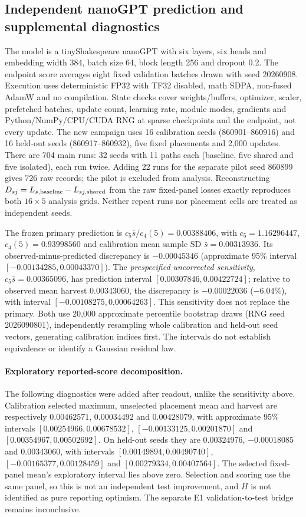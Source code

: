 \subsection{Independent nanoGPT prediction and supplemental diagnostics}
\label{sec:nanogpt-supplement}
The model is a tinyShakespeare nanoGPT with six layers, six heads and
embedding width 384, batch size 64, block length 256 and dropout 0.2.
The endpoint score averages eight fixed validation batches drawn with seed
20260908. Execution uses deterministic FP32 with TF32 disabled, math SDPA,
non-fused AdamW and no compilation. State checks cover weights/buffers,
optimizer, scaler, prefetched batches, update count, learning rate, module
modes, gradients and Python/NumPy/CPU/CUDA RNG at sparse checkpoints and the
endpoint, not every update.
The new campaign uses 16 calibration seeds (860901--860916) and 16
held-out seeds (860917--860932), five fixed placements and 2,000 updates.
There are 704 main runs: 32 seeds with 11 paths each (baseline, five shared
and five isolated), each run twice. Adding 22 runs for the separate pilot
seed 860899 gives 726 raw records; the pilot is excluded from analysis. Reconstructing
$D_{sj}=L_{s,\rm baseline}-L_{sj,\rm shared}$ from the raw fixed-panel
losses exactly reproduces both $16\times5$ analysis grids. Neither repeat
runs nor placement cells are treated as independent seeds.

The frozen primary prediction is $c_5\bar s/c_4(5)=0.00388406$, with
$c_5=1.16296447$, $c_4(5)=0.93998560$ and calibration mean sample SD
$\bar s=0.00313936$. Its observed-minus-predicted discrepancy is
$-0.00045346$ (approximate 95\% interval
$[-0.00134285,0.00043370]$). The \emph{prespecified uncorrected
sensitivity}, $c_5\bar s=0.00365096$, has prediction interval
$[0.00307846,0.00422724]$; relative to observed mean harvest $0.00343060$,
the discrepancy is $-0.00022036$ ($-6.04\%$), with interval
$[-0.00108275,0.00064263]$. This sensitivity does not replace the primary.
Both use 20,000 approximate percentile bootstrap draws (RNG seed
2026090801), independently resampling whole calibration and held-out seed
vectors, generating calibration indices first. The intervals do not
establish equivalence or identify a Gaussian residual law.

\paragraph{Exploratory reported-score decomposition.}
The following diagnostics were added after readout, unlike the sensitivity
above. Calibration selected maximum, unselected placement mean and harvest
are respectively $0.00462571$, $0.00034492$ and $0.00428079$, with
approximate 95\% intervals $[0.00254966,0.00678532]$,
$[-0.00133125,0.00201870]$ and $[0.00354967,0.00502692]$.
On held-out seeds they are $0.00324976$, $-0.00018085$ and $0.00343060$,
with intervals $[0.00149894,0.00490740]$,
$[-0.00165377,0.00128459]$ and $[0.00279334,0.00407564]$.
The selected fixed-panel mean's exploratory interval lies above zero.
Selection and scoring use the same panel, so this is not an independent
test improvement, and $H$ is not identified as pure reporting optimism.
The separate E1 validation-to-test bridge remains inconclusive.

